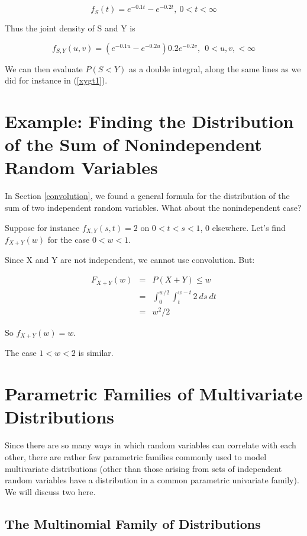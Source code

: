 \begin{equation}
f_{S}(t) = e^{-0.1t} - e^{-0.2t}, ~ 0 < t < \infty
\end{equation}

Thus the joint density of S and Y is 

\begin{equation}
f_{S,Y}(u,v) = (e^{-0.1u} - e^{-0.2u}) 0.2e^{-0.2v}, ~~ 0 < u,v, <
\infty
\end{equation}

We can then evaluate $P(S < Y)$ as a double integral, along the same
lines as we did for instance in (\ref{xygt1}).

\section{Example:  Finding the Distribution of the Sum of Nonindependent
Random Variables}

In Section \ref{convolution}, we found a general formula for the
distribution of the sum of two independent random variables.  What about
the nonindependent case?

Suppose for instance $f_{X,Y}(s,t) = 2$ on $0 < t < s < 1$, 0 elsewhere.
Let's find $f_{X+Y}(w)$ for the case $0 < w < 1$.

Since X and Y are not independent, we cannot use convolution.  But:

\begin{eqnarray}
F_{X+Y}(w) &=& P(X+Y) \leq w\\
&=&
\int_{0}^{w/2}
\int_{t}^{w-t} 2 ~ ds ~ dt \\
&=& w^2 / 2
\end{eqnarray}

So $f_{X+Y}(w) = w$.

The case $1 < w < 2$ is similar.

\section{Parametric Families of Multivariate Distributions}

Since there are so many ways in which random variables can correlate
with each other, there are rather few parametric families commonly used
to model multivariate distributions (other than those arising from sets
of independent random variables have a distribution in a common
parametric univariate family).  We will discuss two here.

\subsection{The Multinomial Family of Distributions}

